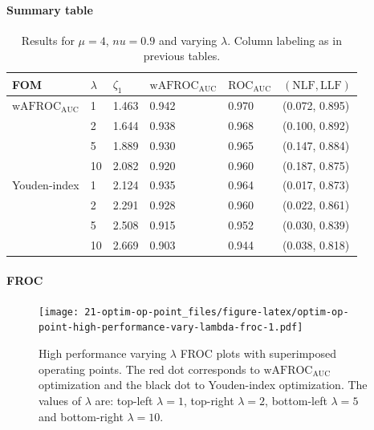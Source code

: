 \documentclass[
]{book}
\begin{document}
\hypertarget{summary-table-6}{%
\paragraph{Summary table}\label{summary-table-6}}

\begin{table}

\caption{\label{tab:optim-op-point-high-performance-vary-lambda-table}Results for $\mu = 4$, $nu = 0.9$ and varying $\lambda$. Column labeling as in previous tables.}
\centering
\fontsize{10}{12}\selectfont
\begin{tabular}[t]{llllll}
\toprule
FOM & $\lambda$ & $\zeta_1$ & $\text{wAFROC}_\text{AUC}$ & $\text{ROC}_\text{AUC}$ & $\left( \text{NLF}, \text{LLF}\right)$\\
\midrule
$\text{wAFROC}_\text{AUC}$ & 1 & 1.463 & 0.942 & 0.970 & (0.072, 0.895)\\
 & 2 & 1.644 & 0.938 & 0.968 & (0.100, 0.892)\\
 & 5 & 1.889 & 0.930 & 0.965 & (0.147, 0.884)\\
 & 10 & 2.082 & 0.920 & 0.960 & (0.187, 0.875)\\
Youden-index & 1 & 2.124 & 0.935 & 0.964 & (0.017, 0.873)\\
\addlinespace
 & 2 & 2.291 & 0.928 & 0.960 & (0.022, 0.861)\\
 & 5 & 2.508 & 0.915 & 0.952 & (0.030, 0.839)\\
 & 10 & 2.669 & 0.903 & 0.944 & (0.038, 0.818)\\
\bottomrule
\end{tabular}
\end{table}

\hypertarget{froc-7}{%
\paragraph{FROC}\label{froc-7}}

\begin{figure}
\centering
\texttt{[image: 21-optim-op-point\_files/figure-latex/optim-op-point-high-performance-vary-lambda-froc-1.pdf]}
\caption{\label{fig:optim-op-point-high-performance-vary-lambda-froc}High performance varying \(\lambda\) FROC plots with superimposed operating points. The red dot corresponds to \(\text{wAFROC}_\text{AUC}\) optimization and the black dot to Youden-index optimization. The values of \(\lambda\) are: top-left \(\lambda = 1\), top-right \(\lambda = 2\), bottom-left \(\lambda = 5\) and bottom-right \(\lambda = 10\).}
\end{figure}
\end{document}
